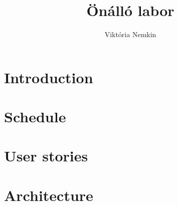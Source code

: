 \documentclass[11pt,oneside]{article}
\author{Viktória Nemkin}
\title{Önálló labor}
\begin{document}
\maketitle
\newpage
\tableofcontents
\newpage

\section{Introduction}
\section{Schedule}
\section{User stories}
\section{Architecture}
\end{document}
